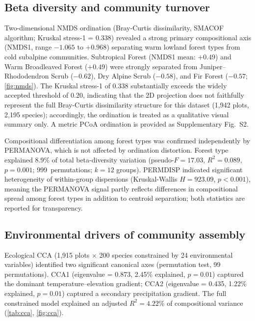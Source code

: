 \documentclass[review,12pt,a4paper]{elsarticle}
\begin{document}
\subsection{Beta diversity and community turnover}
\label{sec:res_beta}

Two-dimensional NMDS ordination (Bray-Curtis dissimilarity, SMACOF algorithm;
Kruskal stress-1 = 0.338) revealed a strong primary compositional axis (NMDS1,
range $-1.065$ to $+0.968$) separating warm lowland forest types from cold
subalpine communities. Subtropical Forest (NMDS1 mean: $+0.49$) and Warm
Broadleaved Forest ($+0.49$) were strongly separated from
Juniper--Rhododendron Scrub ($-0.62$), Dry Alpine Scrub ($-0.58$), and Fir
Forest ($-0.57$; \cref{fig:nmds}). The Kruskal stress-1 of 0.338 substantially
exceeds the widely accepted threshold of 0.20, indicating that the 2D
projection does not faithfully represent the full Bray-Curtis dissimilarity
structure for this dataset (1{,}942 plots, 2{,}195 species); accordingly, the
ordination is treated as a qualitative visual summary only. A metric PCoA
ordination is provided as Supplementary Fig.~S2.

Compositional differentiation among forest types was confirmed independently
by PERMANOVA, which is not affected by ordination distortion. Forest type
explained 8.9\% of total beta-diversity variation
(pseudo-$F = 17.03$, $R^2 = 0.089$, $p = 0.001$; 999~permutations;
$k = 12$ groups). PERMDISP indicated significant heterogeneity of
within-group dispersions (Kruskal-Wallis $H = 923.09$, $p < 0.001$),
meaning the PERMANOVA signal partly reflects differences in compositional
spread among forest types in addition to centroid separation; both statistics
are reported for transparency.

\subsection{Environmental drivers of community assembly}
\label{sec:res_cca}

Ecological CCA (1{,}915 plots $\times$ 200 species constrained by 24
environmental variables) identified two significant canonical axes (permutation
test, 99 permutations). CCA1 (eigenvalue = 0.873, 2.45\% explained,
$p = 0.01$) captured the dominant temperature--elevation gradient; CCA2
(eigenvalue = 0.435, 1.22\% explained, $p = 0.01$) captured a secondary
precipitation gradient. The full constrained model explained an adjusted
$R^2 = 4.22\%$ of compositional variance (\cref{tab:cca}, \cref{fig:cca}).
\end{document}
